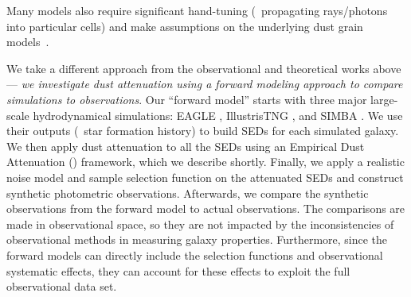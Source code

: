 Many models also require significant hand-tuning (\eg~propagating rays/photons into
particular cells) and make assumptions on the underlying dust grain models~\citep[see][for a review]{steinacker2013}. 

We take a different approach from the observational and theoretical works
above --- \emph{we investigate dust attenuation using a forward modeling
approach to compare simulations to observations}.
Our ``forward model'' starts with three major large-scale hydrodynamical
simulations: EAGLE \citep{schaye2015}, IllustrisTNG \citep{nelson2019}, and SIMBA \citep{dave2019}. 
We use their outputs (\eg~star formation history) to build SEDs for each
simulated galaxy.
We then apply dust attenuation to all the SEDs using an Empirical Dust
Attenuation (\eda) framework, which we describe shortly.
Finally, we apply a realistic noise model and sample selection function on
the attenuated SEDs and construct synthetic photometric observations. 
Afterwards, we compare the synthetic observations from the forward model to
actual observations. 
The comparisons are made in observational space, so they are not impacted
by the inconsistencies of observational methods in measuring galaxy
properties.
Furthermore, since the forward models can directly include the selection
functions and observational systematic effects, they can account for these
effects to exploit the full observational data set.

